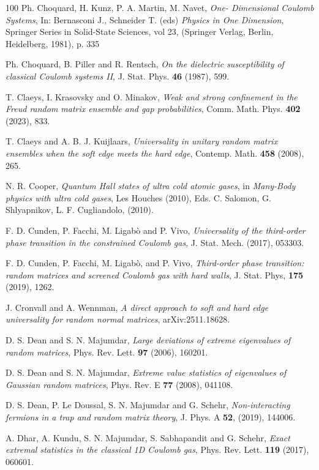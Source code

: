 \documentclass[10pt]{amsart}
\theoremstyle{plain}
\theoremstyle{remark}
\numberwithin{equation}{section}
\begin{document}
\begin{thebibliography}{100}
	Ph. Choquard, H. Kunz, P. A. Martin, M. Navet, \emph{One- Dimensional Coulomb Systems}, In: Bernasconi J., Schneider T. (eds) \emph{Physics in One Dimension}, Springer Series in Solid-State Sciences, vol 23,  ({Springer Verlag, Berlin, Heidelberg, 1981}), p. 335

Ph. Choquard, B. Piller and R. Rentsch, \emph{On the dielectric susceptibility of classical Coulomb systems II}, J. Stat. Phys. \textbf{46} (1987), 599.%

 T. Claeys, I. Krasovsky and O. Minakov, \emph{Weak and strong confinement in the Freud random matrix ensemble and gap probabilities}, Comm. Math. Phys. \textbf{402} (2023), 833.%

 T. Claeys and A. B. J. Kuijlaars, \emph{Universality in unitary random matrix ensembles when the soft edge meets the hard edge}, Contemp. Math. \textbf{458} (2008), 265.%

N. R. Cooper, {\it Quantum Hall states of ultra cold atomic gases}, in {\it Many-Body physics with ultra cold gases}, Les Houches (2010), Eds. C. Salomon, G. Shlyapnikov, L. F. Cugliandolo, (2010).

 F. D. Cunden, P. Facchi, M. Ligab{\`o} and P. Vivo, \emph{Universality of the third-order phase transition in the constrained Coulomb gas}, J. Stat. Mech. (2017), 053303.

F. D. Cunden, P. Facchi, M. Ligabò,  and P. Vivo,
{\it Third-order phase transition: random matrices and screened Coulomb gas with hard walls},
J. Stat. Phys, {\bf 175} (2019), 1262.

 J. Cronvall and A. Wennman, \emph{A direct approach to soft and hard edge universality for random normal matrices}, arXiv:2511.18628. 

 D. S. Dean and S. N. Majumdar, \emph{Large deviations of extreme eigenvalues of random matrices}, Phys. Rev. Lett. \textbf{97} (2006), 160201. 

 D. S. Dean and S. N. Majumdar, \emph{Extreme value statistics of eigenvalues of Gaussian random matrices}, Phys. Rev. E \textbf{77} (2008), 041108. 

 D. S. Dean, P. Le Doussal, S. N. Majumdar and G. Schehr, \emph{Non-interacting fermions in a trap and random matrix theory}, J. Phys. A \textbf{52}, (2019), 144006.


 A. Dhar, A. Kundu, S. N. Majumdar, S. Sabhapandit and G. Schehr, \emph{Exact extremal statistics in the classical 1D Coulomb gas}, Phys. Rev. Lett. \textbf{119} (2017), 060601. 



\end{thebibliography}
\end{document}
